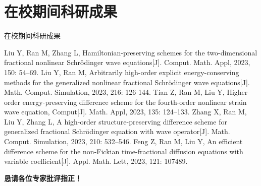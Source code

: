 \documentclass[aspectratio=169]{beamer}
\numberwithin{theorem}{section} %
\numberwithin{equation}{section}%
\numberwithin{figure}{section}%
\numberwithin{table}{section}%
\begin{document}
\section*{在校期间科研成果}
\begin{frame}{在校期间科研成果}\footnotesize
	\begin{thebibliography}{99}  
	 Liu Y, Ran M, Zhang L, Hamiltonian-preserving schemes for the two-dimensional fractional nonlinear Schrödinger wave equations[J]. Comput. Math. Appl, 2023, 150: 54–69.
	 Liu Y, Ran M, Arbitrarily high-order explicit energy-conserving methods for the generalized nonlinear fractional Schrödinger wave equations[J]. Math. Comput. Simulation, 2023, 216: 126-144.
	 Tian Z, Ran M, Liu Y, Higher-order energy-preserving difference scheme for the fourth-order nonlinear strain wave equation, Comput[J]. Math. Appl, 2023, 135: 124–133.
	 Zhang X, Ran M, Liu Y, Zhang L, A high-order structure-preserving difference scheme for generalized fractional Schrödinger equation with wave operator[J]. Math. Comput. Simulation, 2023, 210: 532–546.
	 Feng Z, Ran M, Liu Y, An efficient difference scheme for the non-Fickian time-fractional diffusion equations with variable coefficient[J]. Appl. Math. Lett, 2023, 121: 107489.
	\end{thebibliography}
\end{frame}
 

\begin{frame}
\begin{center}
{\Huge\calligra \textbf{\textcolor[rgb]{0.227,0.373,0.306}{恳请各位专家批评指正！}}}
\end{center}
\end{frame}
\end{document}
